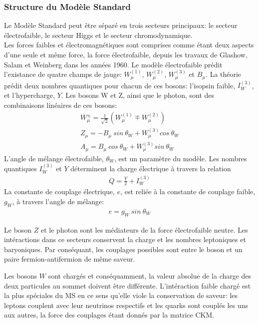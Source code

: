 \subsubsection{Structure du Modèle Standard}
\label{sec:ms:th:struct}

Le Modèle Standard peut être séparé en trois secteurs principaux: le
secteur électrofaible, le secteur Higgs et le secteur chromodynamique. \\

Les forces faibles et électromagnétiques sont comprises comme étant
deux aspects d'une seule et même force, la force électrofaible, depuis
les travaux de Glashow, Salam et Weinberg dans les années
1960. Le modèle électrofaible prédit
l'existance de quatre champs de jauge: $W^{(1)}_\mu$, $W^{(2)}_\mu$,
$W^{(3)}_\mu$ et $B_\mu$. La théorie prédit deux nombres quantiques
pour chacun de ces bosons: l'isopsin faible, $I^{(3)}_W$, et
l'hypercharge, $Y$. Les bosons W et Z, ainsi que le photon, sont des
combinaisons linéaires de ces bosons:
\begin{eqnarray}
  \label{eq:ewk_mix}
  W^{\pm}_\mu = \frac{1}{\sqrt{2}}(W^{(1)}_\mu \mp W^{(2)}_\mu)  \\
  Z_\mu = -B_\mu\ sin\ \theta_W + W^{(3)}_\mu cos\ \theta_W \\
  A_\mu = B_\mu\ cos\ \theta_W + W^{(3)}_\mu sin\ \theta_W
\end{eqnarray}
L'angle de mélange électrofaible, $\theta_W$, est un paramètre du
modèle. Les nombres quantiques $I^{(3)}_W$ et $Y$ déterminent la
charge électrique à travers la relation
\begin{eqnarray}
  Q = \frac{Y}{2} + I^{(3)}_W
\end{eqnarray}
La constante de couplage électrique, $e$, est reliée à la constante de
couplage faible, $g_W$, à travers l'angle de mélange:
\begin{eqnarray}
  e = g_W\ sin\ \theta_W
\end{eqnarray}

Le boson $Z$ et le photon sont les médiateurs de la force
électrofaible neutre. Les intéractions dans ce secteurs conservent la
charge et les nombres leptoniques et baryoniques. Par conséquant, les
couplages possibles sont entre le boson et un paire
fermion-antifermion de même saveur.

Les bosons $W$ sont chargés et conséquamment, la valeur absolue de la
charge des deux particules au sommet doivent être
différente. L'intéraction faible chargé est la plus spéciales du MS en
ce sens qu'elle viole la conservation de saveur: les leptons couplent
avec leur neutrinos respectifs et les quarks sont couplés les uns aux
autres, la force des couplages étant donnés par la matrice CKM. \\

